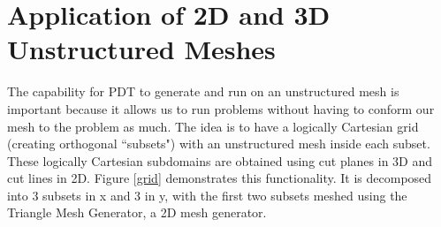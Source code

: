 \documentclass{anstrans}
\begin{document}
\section{Application of 2D and 3D Unstructured Meshes}
\label{ch:motivation}

The capability for PDT to generate and run on an unstructured mesh is important because it allows us to run problems without having to conform our mesh to the problem as much. The idea is to have a logically Cartesian grid (creating orthogonal ``subsets") with an unstructured mesh inside each subset. These logically Cartesian subdomains are obtained using cut planes in 3D and cut lines in 2D. Figure \ref{grid} demonstrates this functionality. It is decomposed into 3 subsets in x and 3 in y, with the first two subsets meshed using the Triangle Mesh Generator\cite{triangle}, a 2D mesh generator.
\end{document}
